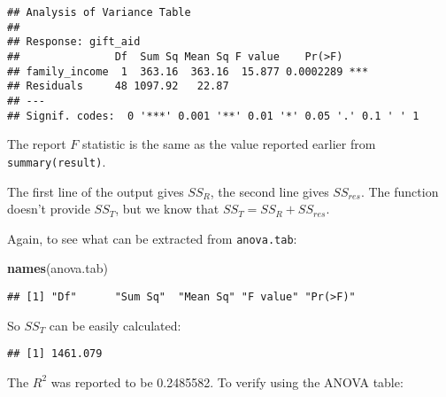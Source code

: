 \documentclass[
]{book}
\newenvironment{Shaded}{\begin{snugshade}}{\end{snugshade}}
\newcommand{\DecValTok}[1]{\textcolor[rgb]{0.00,0.00,0.81}{#1}}
\newcommand{\FunctionTok}[1]{\textcolor[rgb]{0.13,0.29,0.53}{\textbf{#1}}}
\newcommand{\NormalTok}[1]{#1}
\newcommand{\OtherTok}[1]{\textcolor[rgb]{0.56,0.35,0.01}{#1}}
\newcommand{\SpecialCharTok}[1]{\textcolor[rgb]{0.81,0.36,0.00}{\textbf{#1}}}
\newcommand{\StringTok}[1]{\textcolor[rgb]{0.31,0.60,0.02}{#1}}
\begin{document}
\begin{verbatim}
## Analysis of Variance Table
## 
## Response: gift_aid
##               Df  Sum Sq Mean Sq F value    Pr(>F)    
## family_income  1  363.16  363.16  15.877 0.0002289 ***
## Residuals     48 1097.92   22.87                      
## ---
## Signif. codes:  0 '***' 0.001 '**' 0.01 '*' 0.05 '.' 0.1 ' ' 1
\end{verbatim}

The report \(F\) statistic is the same as the value reported earlier from \texttt{summary(result)}.

The first line of the output gives \(SS_{R}\), the second line gives \(SS_{res}\). The function doesn't provide \(SS_T\), but we know that \(SS_T = SS_{R} + SS_{res}\).

Again, to see what can be extracted from \texttt{anova.tab}:

\begin{Shaded}
\begin{Highlighting}[]
\FunctionTok{names}\NormalTok{(anova.tab)}
\end{Highlighting}
\end{Shaded}

\begin{verbatim}
## [1] "Df"      "Sum Sq"  "Mean Sq" "F value" "Pr(>F)"
\end{verbatim}

So \(SS_T\) can be easily calculated:

\begin{Shaded}
\end{Shaded}

\begin{verbatim}
## [1] 1461.079
\end{verbatim}

The \(R^2\) was reported to be 0.2485582. To verify using the ANOVA table:

\begin{Shaded}
\end{Shaded}
\end{document}
